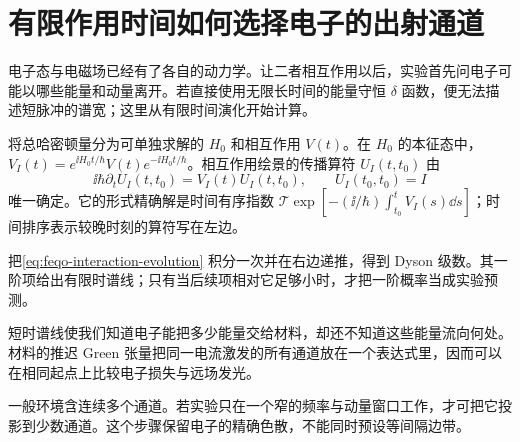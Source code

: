 \chapter{有限作用时间如何选择电子的出射通道}
\label{chap:feqo-transition-kernel}

电子态与电磁场已经有了各自的动力学。让二者相互作用以后，实验首先问电子可能以哪些能量和动量离开。若直接使用无限长时间的能量守恒 \(\delta\) 函数，便无法描述短脉冲的谱宽；这里从有限时间演化开始计算。

\begin{definition}[相互作用绘景与精确传播]
将总哈密顿量分为可单独求解的 \(H_0\) 和相互作用 \(V(t)\)。在 \(H_0\) 的本征态中，\(V_I(t)=e^{\ii H_0t/\hbar}V(t)e^{-\ii H_0t/\hbar}\)。相互作用绘景的传播算符 \(U_I(t,t_0)\) 由
\begin{equation}
\ii\hbar\partial_t U_I(t,t_0)=V_I(t)U_I(t,t_0),\qquad U_I(t_0,t_0)=I
\label{eq:feqo-interaction-evolution}
\end{equation}
唯一确定。它的形式精确解是时间有序指数 \(\mathcal T\exp[-(\ii/\hbar)\int_{t_0}^{t}V_I(s)\dd s]\)；时间排序表示较晚时刻的算符写在左边。
\end{definition}

把\cref{eq:feqo-interaction-evolution} 积分一次并在右边递推，得到 Dyson 级数。其一阶项给出有限时谱线；只有当后续项相对它足够小时，才把一阶概率当成实验预测。



短时谱线使我们知道电子能把多少能量交给材料，却还不知道这些能量流向何处。材料的推迟 Green 张量把同一电流激发的所有通道放在一个表达式里，因而可以在相同起点上比较电子损失与远场发光。



一般环境含连续多个通道。若实验只在一个窄的频率与动量窗口工作，才可把它投影到少数通道。这个步骤保留电子的精确色散，不能同时预设等间隔边带。


